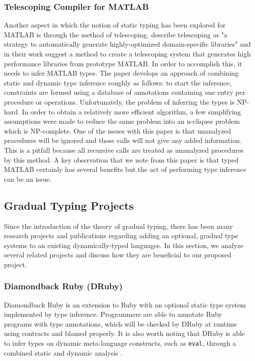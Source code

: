 \subsubsection{Telescoping Compiler for MATLAB}
Another aspect in which the notion of static typing has been explored for MATLAB is through the method of telescoping. \citet{chauhan2003type} describe telescoping as "a strategy to automatically generate highly-optimized domain-specific libraries" and in their work suggest a method to create a telescoping system that generates high performance libraries from prototype MATLAB. In order to accomplish this, it needs to infer MATLAB types. The paper develops an approach of combining static and dynamic type inference roughly as follows: to start the inference, constraints are formed using a database of annotations containing one entry per procedure or operations. Unfortunately, the problem of inferring the types is NP-hard. In order to obtain a relatively more efficient algorithm, a few simplifying assumptions were made to reduce the same problem into an n-cliques problem which is NP-complete. One of the issues with this paper is that unanalyzed procedures will be ignored and those calls will not give any added information. This is a pitfall because all recursive calls are treated as unanalyzed procedures by this method. A key observation that we note from this paper is that typed MATLAB certainly has several benefits but the act of performing type inference can be an issue.

\subsection{Gradual Typing Projects}
Since the introduction of the theory of gradual typing, there has been many research projects and publications regarding adding an optional, gradual type systems to an existing dynamically-typed languages. In this section, we analyze several related projects and discuss how they are beneficial to our proposed project.

\subsubsection{Diamondback Ruby (DRuby)}
Diamondback Ruby \cite{furr2009combining} is an extension to Ruby with an optional static type system implemented by type inference. Programmers are able to annotate Ruby programs with type annotations, which will be checked by DRuby at runtime using contracts and blamed properly. It is also worth noting that DRuby is able to infer types on dynamic meta-language constructs, such as {\tt eval}, through a combined static and dynamic analysis \cite{druby}.

